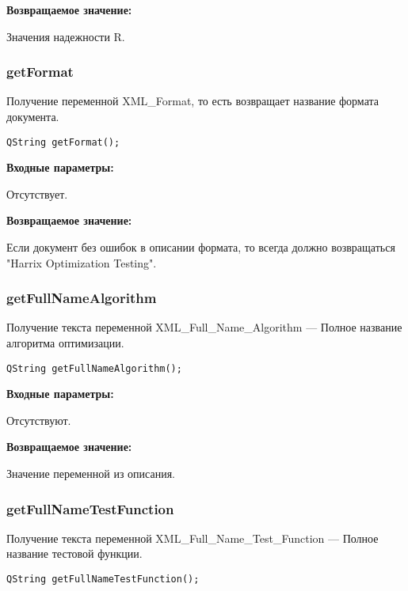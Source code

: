 \textbf{Возвращаемое значение:}

Значения надежности R.


\subsubsection{getFormat}\label{getFormat}

Получение переменной XML\_Format, то есть возвращает название формата документа.


\begin{lstlisting}[label=code_syntax_getFormat,caption=Синтаксис]
QString getFormat();
\end{lstlisting}

\textbf{Входные параметры:}

Отсутствует.

\textbf{Возвращаемое значение:}

Если документ без ошибок в описании формата, то всегда должно возвращаться "Harrix Optimization Testing".


\subsubsection{getFullNameAlgorithm}\label{getFullNameAlgorithm}

Получение текста переменной  XML\_Full\_Name\_Algorithm --- Полное название алгоритма оптимизации.


\begin{lstlisting}[label=code_syntax_getFullNameAlgorithm,caption=Синтаксис]
QString getFullNameAlgorithm();
\end{lstlisting}

\textbf{Входные параметры:}

Отсутствуют.

\textbf{Возвращаемое значение:}

Значение переменной из описания.


\subsubsection{getFullNameTestFunction}\label{getFullNameTestFunction}

Получение текста переменной  XML\_Full\_Name\_Test\_Function --- Полное название тестовой функции.


\begin{lstlisting}[label=code_syntax_getFullNameTestFunction,caption=Синтаксис]
QString getFullNameTestFunction();
\end{lstlisting}

